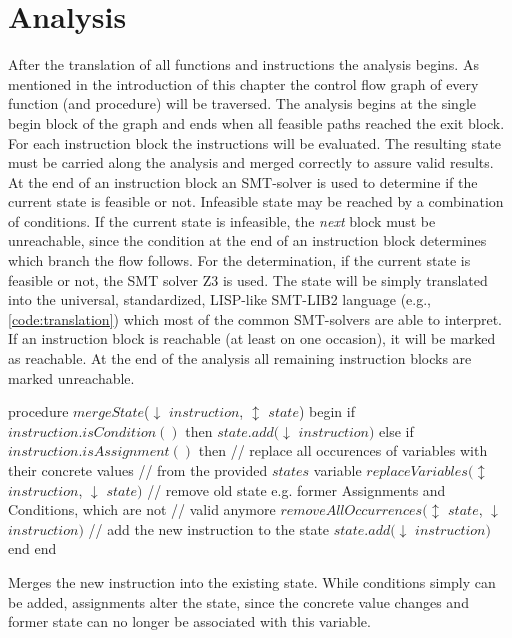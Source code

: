 \section{Analysis}
\label{sec:analysis}
After the translation of all functions and instructions the analysis begins. As mentioned in the introduction of this chapter the control flow graph of every function (and procedure) will be traversed. The analysis begins at the single begin block of the graph and ends when all feasible paths reached the exit block.  
For each instruction block the instructions will be evaluated. The resulting state must be carried along the analysis and merged correctly to assure valid results. At the end of an instruction block an SMT-solver is used to determine if the current state is feasible or not. Infeasible state may be reached by a combination of conditions. If the current state is infeasible, the \emph{next} block must be unreachable, since the condition at the end of an instruction block determines which branch the flow follows. 
For the determination, if the current state is feasible or not, the SMT solver Z3 \cite{demouraZ3EfficientSMT2008} is used. The state will be simply translated into the universal, standardized, LISP-like SMT-LIB2 language (e.g., \ref{code:translation}) which most of the common SMT-solvers are able to interpret. If an instruction block is reachable (at least on one occasion), it will be marked as reachable. At the end of the analysis all remaining instruction blocks are marked unreachable.
\clearpage
\pagebreak
\begin{program}[h!]
	\begin{GenericCode}
procedure $mergeState$($\downarrow$ $instruction$, $\updownarrow$ $state$) begin
	if $instruction.isCondition()$ then
		$state.add($$\downarrow$ $instruction$$)$
	else if $instruction.isAssignment()$ then
		// replace all occurences of variables with their concrete values
		// from the provided $states$ variable
		$replaceVariables($$\updownarrow$ $instruction$, $\downarrow$ $state$$)$ 
		// remove old state e.g. former Assignments and Conditions, which are not
		// valid anymore
		$removeAllOccurrences($$\updownarrow$ $state$, $\downarrow$ $instruction$$)$
		// add the new instruction to the state
		$state.add($$\downarrow$ $instruction$$)$
	end 
end	\end{GenericCode}
	\caption{Merges the new instruction into the existing state. While conditions simply can be added, assignments alter the state, since the concrete value changes and former state can no longer be associated with this variable. }
\label{code:merge state}
\end{program}
